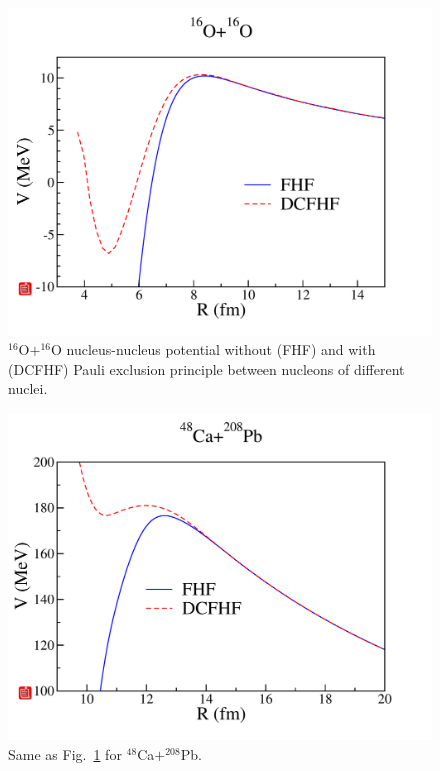 \begin{figure}
	\includegraphics[width=\textwidth]{../Figures/Pauli/pot_16O+16O.pdf}
	\caption{$^{16}$O$+^{16}$O nucleus-nucleus potential without (FHF) and with (DCFHF) 
		Pauli exclusion principle between nucleons of different nuclei. }
	\label{fig:O+O}
\end{figure}

\begin{figure}
	\includegraphics[width=\textwidth]{../Figures/Pauli/pot_48Ca+208Pb.pdf}
	\caption{ Same as Fig.~\ref{fig:O+O} for $^{48}$Ca$+^{208}$Pb. \hfill \phantom{.}}
	\label{fig:Ca+Pb}
\end{figure}

